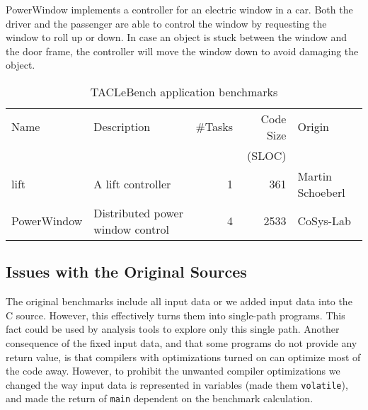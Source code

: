 \documentclass[a4paper,UKenglish]{oasics}
\newcommand{\todo}[1]{{\emph{TODO: #1}}}
\newcommand{\code}[1]{{\small{\texttt{#1}}}}
\renewcommand{\todo}[1]{}
\begin{document}
PowerWindow implements a controller for an electric window in a car.
Both the driver and the passenger are able to control the window by 
requesting the window to roll up or down.
In case an object is stuck between the window and the door frame,
the controller will move the window down to avoid damaging the object.

\begin{table}
\centering
\caption{\label{tab:bench_app}TACLeBench application benchmarks}
\begin{tabular}{lL{5cm}rrR{2cm}}
\toprule
Name & Description & \#Tasks & Code Size & Origin\\

     &             &         &     (SLOC) & \\ \midrule
lift & A lift controller & 1 & 361 & Martin Schoeberl\\
PowerWindow & Distributed power window control & 4 & 2533 & CoSys-Lab \\
\bottomrule
\end{tabular}
\end{table}

\subsection{Issues with the Original Sources}


\todo{Show the issues with code snippets. Or the difference with the original one
and the updated one with patmos-clang -O3 and pasim.}

\todo{Show how compiler optimizations optimized away the original code and how we fixed this}

The original benchmarks include all input data or we added input data into the C source.
However, this effectively turns them into single-path programs.
This fact could be used by analysis tools to explore only this single path.
Another consequence of the fixed
input data, and that some programs do not provide
any return value, is that compilers with optimizations turned on can optimize
most of the code away.
However, to prohibit the unwanted compiler optimizations we changed
the way input data is represented in variables (made them \code{volatile}),
and made the return of \code{main} dependent on the benchmark calculation.

\end{document}
